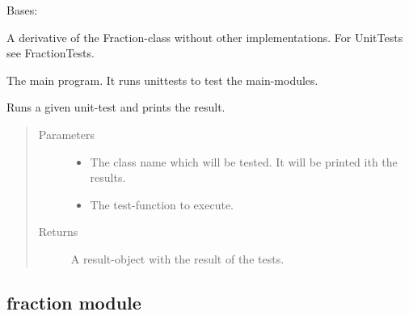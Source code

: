\documentclass[letterpaper,10pt,english]{sphinxhowto}
\begin{document}
\begin{fulllineitems}
\label{\detokenize{bruch:bruch.Bruch}}
Bases: {\hyperref[\detokenize{fraction:fraction.Fraction}]{}}

A derivative of the Fraction-class without other implementations.
For UnitTests see FractionTests.

\end{fulllineitems}


\begin{fulllineitems}
\label{\detokenize{bruch:bruch.main}}
The main program. It runs unittests to test the main-modules.

\end{fulllineitems}


\begin{fulllineitems}
\label{\detokenize{bruch:bruch.run_test}}
Runs a given unit-test and prints the result.
\begin{quote}\begin{description}
\item[{Parameters}] \leavevmode\begin{itemize}
\item {} 
 \textendash{} The class name which will be tested. It will be printed ith the results.

\item {} 
 \textendash{} The test-function to execute.

\end{itemize}

\item[{Returns}] \leavevmode
A result-object with the result of the tests.

\end{description}\end{quote}

\end{fulllineitems}



\subsection{fraction module}
\label{\detokenize{fraction:fraction-module}}\label{\detokenize{fraction::doc}}
\end{document}
